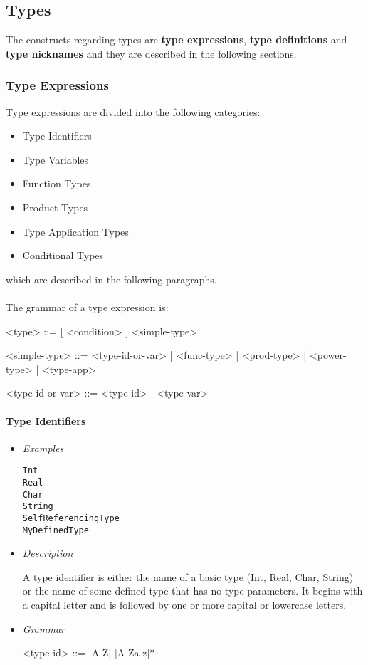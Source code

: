 \documentclass{article}
\begin{document}
\subsection{Types}
\label{subsec:types}

The constructs regarding types are \textbf{type expressions}, \textbf{type
definitions} and \textbf{type nicknames} and they are described in the
following sections.

\subsubsection{Type Expressions}

Type expressions are divided into the following categories:
\begin{itemize}
\item Type Identifiers
\item Type Variables
\item Function Types
\item Product Types
\item Type Application Types
\item Conditional Types
\end{itemize}
which are described in the following paragraphs.
\\\\
The grammar of a type expression is:
\begin{grammar}
<type> ::= [ <condition> ]  <simple-type> 

<simple-type> ::=
<type-id-or-var> | <func-type> | <prod-type> | <power-type> | <type-app>

<type-id-or-var> ::= <type-id> | <type-var>
\\
\end{grammar}
\paragraph{Type Identifiers}

\begin{itemize}
\item \textit{Examples}
\begin{verbatim}
Int
Real 
Char 
String
SelfReferencingType
MyDefinedType
\end{verbatim}

\item \textit{Description}

A type identifier is either the name of a basic type (Int, Real, Char, String) or
the name of some defined type that has no type parameters. It begins with a capital
letter and is followed by one or more capital or lowercase letters.

\item \textit{Grammar}
\begin{grammar}
<type-id> ::= [A-Z] [A-Za-z]*
\end{grammar}
\end{itemize}
\end{document}
